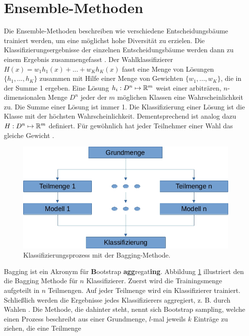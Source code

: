 \section{Ensemble-Methoden}
\label{sec:Ensemble}
\label{sec:wahlklassifizierer}
Die Ensemble-Methoden beschreiben wie verschiedene Entscheidungsbäume trainiert werden, um eine möglichst hohe Diversität zu erzielen. Die Klassifizierungsergebnisse der einzelnen Entscheidungsbäume werden
dann zu einem Ergebnis zusammengefasst \cite{dietterich2002ensemble}.
\newline
\newline
Der Wahlklassifizierer $H(x) = w_1 h_1(x) + ... + w_K h_K(x)$ fasst eine Menge von Lösungen $\{h_1, ..., h_K\}$ zusammen mit Hilfe einer Menge von Gewichten $\{w_1, ..., w_K\}$, die in der Summe 1
ergeben. Eine Lösung $h_i: D^n \mapsto {\mathbb R}^m$ weist einer arbiträren, $n$-dimensionalen Menge $D^n$ jeder der $m$ möglichen Klassen eine Wahrscheinlichkeit zu.
Die Summe einer Lösung ist immer 1. Die Klassifizierung einer Lösung ist die Klasse mit der höchsten Wahrscheinlichkeit. Dementsprechend ist analog dazu $H: D^n \mapsto {\mathbb R}^m$ definiert.
Für gewöhnlich hat jeder Teilnehmer einer Wahl das gleiche Gewicht \cite{dietterich2002ensemble}.
\begin{figure}
    \centering
    \includegraphics[width=0.6\linewidth]{images/bagging.jpg}
    \caption{Klassifizierungsprozess mit der Bagging-Methode.}
    \label{fig:bagging}
\end{figure}
\newline
\newline
Bagging ist ein Akronym für \glqq \textbf{B}ootstrap \textbf{agg}regat\textbf{ing}\grqq. Abbildung \ref{fig:bagging} illustriert den die Bagging Methode für $n$ Klassifizierer. Zuerst wird die Trainingsmenge
aufgeteilt in $n$ Teilmengen. Auf jeder Teilmenge wird ein Klassifizierer trainiert. Schließlich werden die Ergebnisse jedes Klassifizierers aggregiert, z. B. durch Wahlen \cite{breiman1996bagging}.
Die Methode, die dahinter steht, nennt sich \glqq Bootstrap sampling\grqq, welche einen Prozess beschreibt aus einer Grundmenge, $l$-mal jeweils $k$ Einträge zu ziehen, die eine Teilmenge
